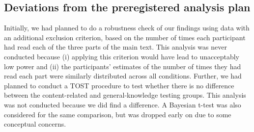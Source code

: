 \documentclass[
  11pt,
]{article}
\begin{document}
\hypertarget{deviations-from-the-preregistered-analysis-plan}{%
\subsection{Deviations from the preregistered analysis
plan}\label{deviations-from-the-preregistered-analysis-plan}}

Initially, we had planned to do a robustness check of our findings using
data with an additional exclusion criterion, based on the number of
times each participant had read each of the three parts of the main
text. This analysis was never conducted because (i) applying this
criterion would have lead to unacceptably low power and (ii) the
participants' estimates of the number of times they had read each part
were similarly distributed across all conditions. Further, we had
planned to conduct a TOST procedure to test whether there is no
difference between the content-related and general-knowledge testing
groups. This analysis was not conducted because we did find a
difference. A Bayesian t-test was also considered for the same
comparison, but was dropped early on due to some conceptual concerns.
\end{document}
